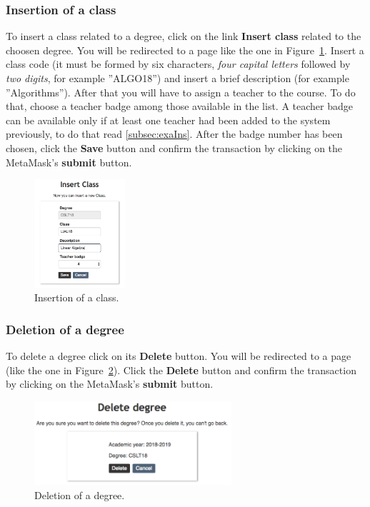 \subsubsection{Insertion of a class} \label{sssec:clsIns}
To insert a class related to a degree, click on the link \textbf{Insert class} related to the choosen degree. You will be redirected to a page like the one in Figure~\ref{fig:insertDidacticActivity}. Insert a class code (it must be formed by six characters, \emph{four capital letters} followed by \emph{two digits}, for example ''ALGO18'') and insert a brief description (for example ''Algorithms''). After that you will have to assign a teacher to the course. To do that, choose a teacher badge among those available in the list. A teacher badge can be available only if at least one teacher had been added to the system previously, to do that read \ref{subsec:exaIns}. After the badge number has been chosen, click the \textbf{Save} button and confirm the transaction by clicking on the MetaMask's \textbf{submit} button.
\begin{figure}[!h]
  \centering
  \includegraphics[width=0.30\textwidth]{img/insertDidacticActivity.png}
  \caption{Insertion of a class.}
  \label{fig:insertDidacticActivity}
\end{figure}

\subsubsection{Deletion of a degree}
To delete a degree click on its \textbf{Delete} button. You will be redirected to a page (like the one in Figure~\ref{fig:deleteDegree}). Click the \textbf{Delete} button and confirm the transaction by clicking on the MetaMask's \textbf{submit} button.
\begin{figure}[!h]
  \centering
  \includegraphics[width=0.65\textwidth]{img/deleteDegree.png}
  \caption{Deletion of a degree.}
  \label{fig:deleteDegree}
\end{figure}

